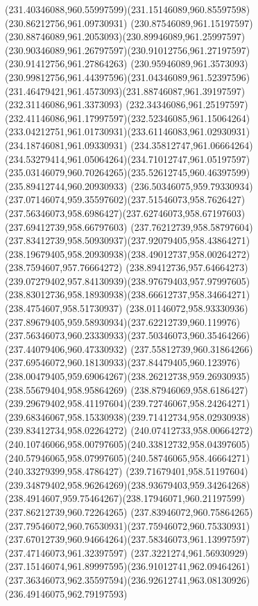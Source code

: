 {{		\curveto(231.40346088,960.55997599)(231.15146089,960.85597598)(230.86212756,961.09730931)
		\curveto(230.87546089,961.15197597)(230.88746089,961.2053093)(230.89946089,961.25997597)
		\curveto(230.90346089,961.26797597)(230.91012756,961.27197597)(230.91412756,961.27864263)
		\curveto(230.95946089,961.3573093)(230.99812756,961.44397596)(231.04346089,961.52397596)
		\curveto(231.46479421,961.4573093)(231.88746087,961.39197597)(232.31146086,961.3373093)
		\curveto(232.34346086,961.25197597)(232.41146086,961.17997597)(232.52346085,961.15064264)
		\curveto(233.04212751,961.01730931)(233.61146083,961.02930931)(234.18746081,961.09330931)
		\curveto(234.35812747,961.06664264)(234.53279414,961.05064264)(234.71012747,961.05197597)
		\curveto(235.03146079,960.70264265)(235.52612745,960.46397599)(235.89412744,960.20930933)
		\curveto(236.50346075,959.79330934)(237.07146074,959.35597602)(237.51546073,958.7626427)
		\curveto(237.56346073,958.6986427)(237.62746073,958.67197603)(237.69412739,958.66797603)
		\curveto(237.76212739,958.58797604)(237.83412739,958.50930937)(237.92079405,958.43864271)
		\curveto(238.19679405,958.20930938)(238.49012737,958.00264272)(238.7594607,957.76664272)
		\curveto(238.89412736,957.64664273)(239.07279402,957.84130939)(238.97679403,957.97997605)
		\curveto(238.83012736,958.18930938)(238.66612737,958.34664271)(238.4754607,958.51730937)
		\curveto(238.01146072,958.93330936)(237.89679405,959.58930934)(237.62212739,960.119976)
		\curveto(237.56346073,960.23330933)(237.50346073,960.35464266)(237.44079406,960.47330932)
		\curveto(237.55812739,960.31864266)(237.69546072,960.18130933)(237.84479405,960.123976)
		\curveto(238.00479405,959.69064267)(238.26212738,959.26930935)(238.55679404,958.95864269)
		\curveto(238.87946069,958.6186427)(239.29679402,958.41197604)(239.72746067,958.24264271)
		\curveto(239.68346067,958.15330938)(239.71412734,958.02930938)(239.83412734,958.02264272)
		\curveto(240.07412733,958.00664272)(240.10746066,958.00797605)(240.33812732,958.04397605)
		\curveto(240.57946065,958.07997605)(240.58746065,958.46664271)(240.33279399,958.4786427)
		\curveto(239.71679401,958.51197604)(239.34879402,958.96264269)(238.93679403,959.34264268)
		\curveto(238.4914607,959.75464267)(238.17946071,960.21197599)(237.86212739,960.72264265)
		\curveto(237.83946072,960.75864265)(237.79546072,960.76530931)(237.75946072,960.75330931)
		\curveto(237.67012739,960.94664264)(237.58346073,961.13997597)(237.47146073,961.32397597)
		\curveto(237.3221274,961.56930929)(237.15146074,961.89997595)(236.91012741,962.09464261)
		\curveto(237.36346073,962.35597594)(236.92612741,963.08130926)(236.49146075,962.79197593)
}}
